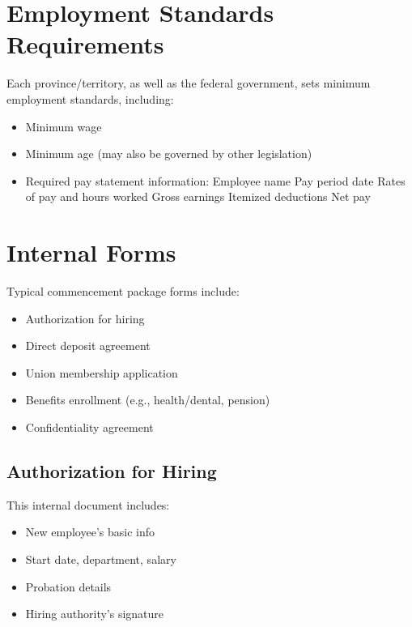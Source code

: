 \documentclass[letterpaper,10pt,english]{sphinxmanual}
\begin{document}
\section{Employment Standards Requirements}
\label{\detokenize{onboarding_employee:employment-standards-requirements}}
\sphinxAtStartPar
Each province/territory, as well as the federal government, sets minimum employment standards, including:
\begin{itemize}
\item {} 
\sphinxAtStartPar
Minimum wage

\item {} 
\sphinxAtStartPar
Minimum age (may also be governed by other legislation)

\item {} 
\sphinxAtStartPar
Required pay statement information:
\sphinxhyphen{} Employee name
\sphinxhyphen{} Pay period date
\sphinxhyphen{} Rates of pay and hours worked
\sphinxhyphen{} Gross earnings
\sphinxhyphen{} Itemized deductions
\sphinxhyphen{} Net pay

\end{itemize}


\section{Internal Forms}
\label{\detokenize{onboarding_employee:internal-forms}}
\sphinxAtStartPar
Typical commencement package forms include:
\begin{itemize}
\item {} 
\sphinxAtStartPar
Authorization for hiring

\item {} 
\sphinxAtStartPar
Direct deposit agreement

\item {} 
\sphinxAtStartPar
Union membership application

\item {} 
\sphinxAtStartPar
Benefits enrollment (e.g., health/dental, pension)

\item {} 
\sphinxAtStartPar
Confidentiality agreement

\end{itemize}


\subsection{Authorization for Hiring}
\label{\detokenize{onboarding_employee:authorization-for-hiring}}
\sphinxAtStartPar
This internal document includes:
\begin{itemize}
\item {} 
\sphinxAtStartPar
New employee’s basic info

\item {} 
\sphinxAtStartPar
Start date, department, salary

\item {} 
\sphinxAtStartPar
Probation details

\item {} 
\sphinxAtStartPar
Hiring authority’s signature

\end{itemize}
\end{document}
